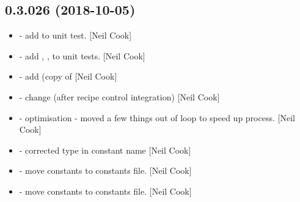 \documentclass[a4paper,10pt,english]{report}
\begin{document}
\subsection{0.3.026 (2018-10-05)}
\label{\detokenize{misc/changelog:id306}}\begin{itemize}
\item {} 
 - add  to unit test. {[}Neil Cook{]}

\item {} 
 - add , ,
 to unit tests. {[}Neil Cook{]}

\item {} 
 - add  (copy of 
{[}Neil Cook{]}

\item {} 
 - change  (after recipe control
integration) {[}Neil Cook{]}

\item {} 
 - optimisation - moved a few things out of loop to
speed up process. {[}Neil Cook{]}

\item {} 
 - corrected type in constant name
 {[}Neil Cook{]}

\item {} 
 - move  constants to
constants file. {[}Neil Cook{]}

\item {} 
 - move constants to constants file. {[}Neil Cook{]}

\end{itemize}
\end{document}
